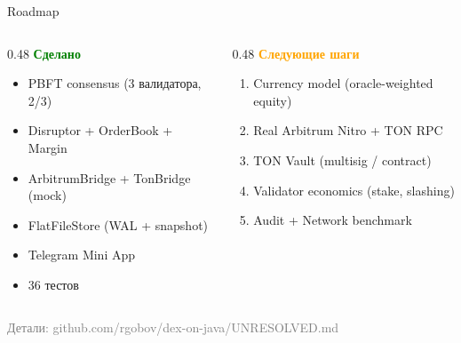 \documentclass[aspectratio=169]{beamer}
\begin{document}
\begin{frame}{Roadmap}

\begin{columns}[t]
\begin{column}{0.48\textwidth}
\textcolor{green}{\textbf{Сделано}}
\begin{itemize}
    \item PBFT consensus (3 валидатора, 2/3)
    \item Disruptor + OrderBook + Margin
    \item ArbitrumBridge + TonBridge (mock)
    \item FlatFileStore (WAL + snapshot)
    \item Telegram Mini App
    \item 36 тестов
\end{itemize}
\end{column}
\begin{column}{0.48\textwidth}
\textcolor{orange}{\textbf{Следующие шаги}}
\begin{enumerate}
    \item Currency model (oracle-weighted equity)
    \item Real Arbitrum Nitro + TON RPC
    \item TON Vault (multisig / contract)
    \item Validator economics (stake, slashing)
    \item Audit + Network benchmark
\end{enumerate}
\end{column}
\end{columns}

\vspace{0.3em}
\centering\footnotesize\textcolor{gray}{Детали: github.com/rgobov/dex-on-java/UNRESOLVED.md}
\end{frame}
\end{document}
